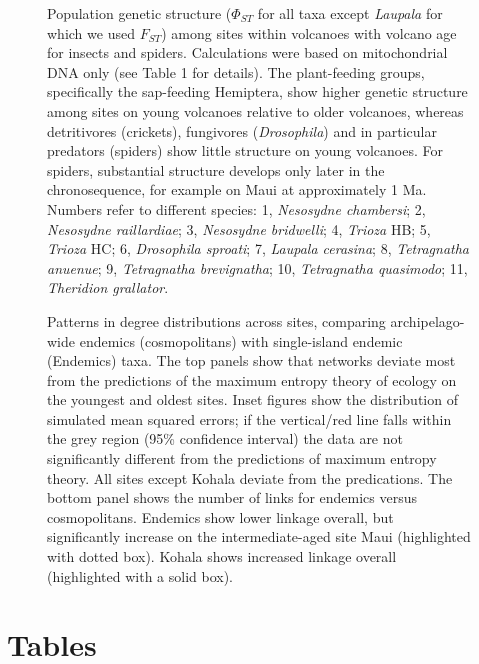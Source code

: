 \begin{figure}[!hp] \centering
  \caption[Population genetic structure]{Population genetic structure
($\Phi_{ST}$ for all taxa except \textit{Laupala} for which we used
$F_{ST}$) among sites within volcanoes with volcano age for insects
and spiders. Calculations were based on mitochondrial DNA only (see
Table 1 for details). The plant-feeding groups, specifically the
sap-feeding Hemiptera, show higher genetic structure among sites on
young volcanoes relative to older volcanoes, whereas detritivores
(crickets), fungivores (\textit{Drosophila}) and in particular
predators (spiders) show little structure on young volcanoes. For
spiders, substantial structure develops only later in the
chronosequence, for example on Maui at approximately 1 Ma. Numbers
refer to different species: 1, \textit{Nesosydne chambersi}; 2,
\textit{Nesosydne raillardiae}; 3, \textit{Nesosydne bridwelli}; 4,
\textit{Trioza} HB; 5, \textit{Trioza} HC; 6, \textit{Drosophila
sproati}; 7, \textit{Laupala cerasina}; 8, \textit{Tetragnatha
anuenue}; 9, \textit{Tetragnatha brevignatha}; 10, \textit{Tetragnatha
quasimodo}; 11, \textit{Theridion grallator}.}
  \label{fig:popGen}
\end{figure}

\begin{figure}[!hp] \centering
  \caption[Patterns in degree distributions across sites]{Patterns in
degree distributions across sites, comparing archipelago-wide endemics
(cosmopolitans) with single-island endemic (Endemics) taxa. The top
panels show that networks deviate most from the predictions of the
maximum entropy theory of ecology on the youngest and oldest
sites. Inset figures show the distribution of simulated mean squared
errors; if the vertical/red line falls within the grey region (95\%
confidence interval) the data are not significantly different from the
predictions of maximum entropy theory. All sites except Kohala deviate
from the predications. The bottom panel shows the number of links for
endemics versus cosmopolitans. Endemics show lower linkage overall,
but significantly increase on the intermediate-aged site Maui
(highlighted with dotted box). Kohala shows increased linkage overall
(highlighted with a solid box).}
  \label{fig:degree}
\end{figure}

\clearpage

\section*{Tables}

